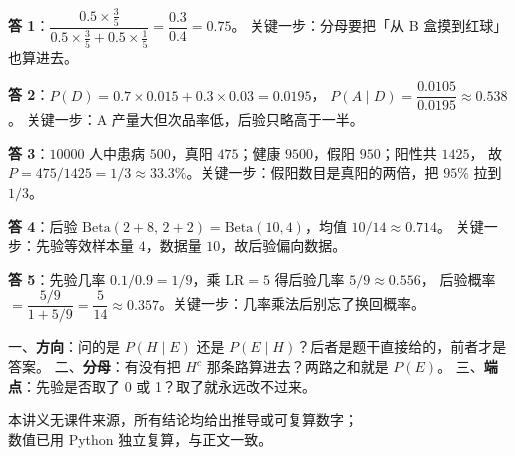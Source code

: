 \documentclass[11pt]{ctexart}
\begin{document}
\textbf{答 1}：$\dfrac{0.5\times\frac{3}{5}}{0.5\times\frac{3}{5}+0.5\times\frac{1}{5}}=\dfrac{0.3}{0.4}=0.75$。
关键一步：分母要把「从 B 盒摸到红球」也算进去。

\textbf{答 2}：$P(D)=0.7\times0.015+0.3\times0.03=0.0195$，
$P(A\mid D)=\dfrac{0.0105}{0.0195}\approx 0.538$。
关键一步：A 产量大但次品率低，后验只略高于一半。

\textbf{答 3}：$10000$ 人中患病 $500$，真阳 $475$；健康 $9500$，假阳 $950$；阳性共 $1425$，
故 $P=475/1425=1/3\approx 33.3\%$。关键一步：假阳数目是真阳的两倍，把 $95\%$ 拉到 $1/3$。

\textbf{答 4}：后验 $\mathrm{Beta}(2+8,\,2+2)=\mathrm{Beta}(10,4)$，均值 $10/14\approx 0.714$。
关键一步：先验等效样本量 $4$，数据量 $10$，故后验偏向数据。

\textbf{答 5}：先验几率 $0.1/0.9=1/9$，乘 $\mathrm{LR}=5$ 得后验几率 $5/9\approx 0.556$，
后验概率 $=\dfrac{5/9}{1+5/9}=\dfrac{5}{14}\approx 0.357$。关键一步：几率乘法后别忘了换回概率。


\begin{center}
\end{center}


一、\textbf{方向}：问的是 $P(H\mid E)$ 还是 $P(E\mid H)$？后者是题干直接给的，前者才是答案。
二、\textbf{分母}：有没有把 $H^{c}$ 那条路算进去？两路之和就是 $P(E)$。
三、\textbf{端点}：先验是否取了 0 或 1？取了就永远改不过来。

\flowerrule

\begin{center}
{\small\color{inkgray}本讲义无课件来源，所有结论均给出推导或可复算数字；\\
数值已用 Python 独立复算，与正文一致。}
\end{center}
\end{document}

